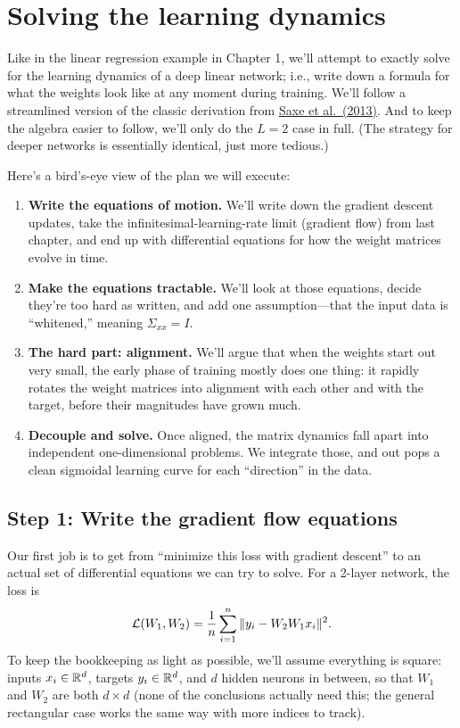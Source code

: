 \section{Solving the learning dynamics}

Like in the linear regression example in Chapter 1, we'll attempt to exactly solve for the learning dynamics of a deep linear network; i.e., write down a formula for what the weights look like at any moment during training. We'll follow a streamlined version of the classic derivation from
\href{https://arxiv.org/pdf/1312.6120}{Saxe et al.\ (2013)}. And to keep the algebra easier to follow, we'll only do the $L = 2$ case in full. (The strategy for deeper networks is essentially identical, just more tedious.)

Here's a bird's-eye view of the plan we will execute:

\begin{enumerate}
    \item \textbf{Write the equations of motion.} We'll write down the gradient
    descent updates, take the infinitesimal-learning-rate limit (gradient flow)
    from last chapter, and end up with differential equations for how the weight
    matrices evolve in time.
    \item \textbf{Make the equations tractable.} We'll look at those equations,
    decide they're too hard as written, and add one assumption---that the input
    data is ``whitened,'' meaning $\Sigma_{xx} = I$.
    \item \textbf{The hard part: alignment.} We'll argue that when the weights
    start out very small, the early phase of training mostly does one thing: it
    rapidly rotates the weight matrices into alignment with each other and with
    the target, before their magnitudes have grown much.
    \item \textbf{Decouple and solve.} Once aligned, the matrix dynamics fall
    apart into independent one-dimensional problems. We integrate those, and out
    pops a clean sigmoidal learning curve for each ``direction'' in the data.
\end{enumerate}

\subsection{Step 1: Write the gradient flow equations}

Our first job is to get from ``minimize this loss with gradient descent'' to an actual set of differential equations we can try to solve. For a 2-layer network, the loss is
\begin{align*}
    \mathcal{L}(W_1, W_2) = \frac{1}{n} \sum_{i=1}^{n} \|y_i - W_2 W_1 x_i\|^2.
\end{align*}
To keep the bookkeeping as light as possible, we'll assume everything is square:
inputs $x_i \in \mathbb{R}^d$, targets $y_i \in \mathbb{R}^d$, and $d$ hidden neurons in between,
so that $W_1$ and $W_2$ are both $d \times d$ (none of the conclusions actually
need this; the general rectangular case works the same way with more indices to
track).

